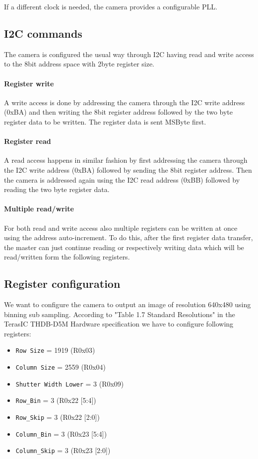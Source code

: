 \documentclass{article}
\begin{document}
If a different clock is needed, the camera provides a configurable PLL.

\subsection{I2C commands}

The camera is configured the usual way through I2C having read and write access to the 8bit address space with 2byte register size.

\paragraph{Register write}
A write access is done by addressing the camera through the I2C write address (0xBA) and then writing the 8bit register address followed by the two byte register data to be written. The register data is sent MSByte first.

\paragraph{Register read}
A read access happens in similar fashion by first addressing the camera through the I2C write address (0xBA) followed by sending the 8bit register address. Then the camera is addressed again using the I2C read address (0xBB) followed by reading the two byte register data.

\paragraph{Multiple read/write}
For both read and write access also multiple registers can be written at once using the address auto-increment. To do this, after the first register data transfer, the master can just continue reading or respectively writing data which will be read/written form the following registers.

\subsection{Register configuration}

We want to configure the camera to output an image of resolution 640x480 using binning sub sampling.
According to "Table 1.7 Standard Resolutions" in the TerasIC THDB-D5M Hardware specification we have to configure following registers:
\begin{itemize}
\item \verb'Row Size' = 1919 (R0x03)
\item \verb'Column Size' = 2559 (R0x04)
\item \verb'Shutter Width Lower' = 3 (R0x09)
\item \verb'Row_Bin' = 3 (R0x22 [5:4])
\item \verb'Row_Skip' = 3 (R0x22 [2:0])
\item \verb'Column_Bin' = 3 (R0x23 [5:4])
\item \verb'Column_Skip' = 3 (R0x23 [2:0])
\end{itemize}
\end{document}

